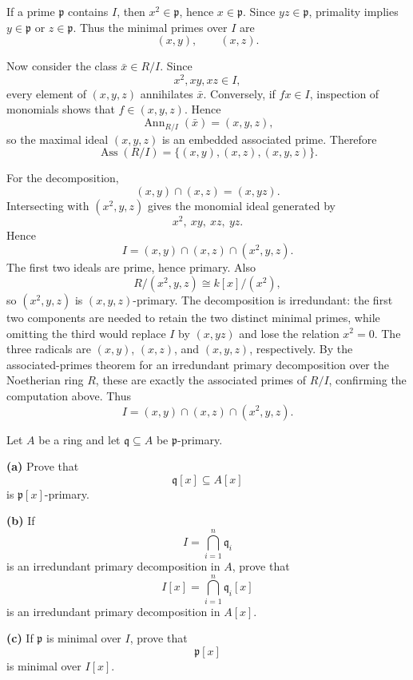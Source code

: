\begin{solution}
If a prime \(\mathfrak p\) contains \(I\), then \(x^2\in\mathfrak p\), hence
\(x\in\mathfrak p\). Since \(yz\in\mathfrak p\), primality implies
\(y\in\mathfrak p\) or \(z\in\mathfrak p\). Thus the minimal primes over
\(I\) are
\[
(x,y),\qquad(x,z).
\]

Now consider the class \(\bar x\in R/I\). Since
\[
x^2,xy,xz\in I,
\]
every element of \((x,y,z)\) annihilates \(\bar x\). Conversely, if
\(fx\in I\), inspection of monomials shows that \(f\in(x,y,z)\). Hence
\[
\operatorname{Ann}_{R/I}(\bar x)=(x,y,z),
\]
so the maximal ideal \((x,y,z)\) is an embedded associated prime. Therefore
\[
\operatorname{Ass}(R/I)
=
\{(x,y),(x,z),(x,y,z)\}.
\]

For the decomposition,
\[
(x,y)\cap(x,z)=(x,yz).
\]
Intersecting with \((x^2,y,z)\) gives the monomial ideal generated by
\[
x^2,\ xy,\ xz,\ yz.
\]
Hence
\[
I=(x,y)\cap(x,z)\cap(x^2,y,z).
\]
The first two ideals are prime, hence primary. Also
\[
R/(x^2,y,z)\cong k[x]/(x^2),
\]
so \((x^2,y,z)\) is \((x,y,z)\)-primary. The decomposition is irredundant: the first two components are
needed to retain the two distinct minimal primes, while omitting the
third would replace $I$ by $(x,yz)$ and lose the relation $x^2=0$.
The three radicals are $(x,y)$, $(x,z)$, and $(x,y,z)$, respectively.
By the associated-primes theorem for an irredundant primary
decomposition over the Noetherian ring $R$, these are exactly the
associated primes of $R/I$, confirming the computation above.
Thus
\[
\boxed{
I=(x,y)\cap(x,z)\cap(x^2,y,z)
}.
\]
\end{solution}


\begin{problem}[CP-V-0029]
\label{prob:cp-v-0029}
Let \(A\) be a ring and let \(\mathfrak q\subseteq A\) be
\(\mathfrak p\)-primary.

\textbf{(a)} Prove that
\[
\mathfrak q[x]\subseteq A[x]
\]
is \(\mathfrak p[x]\)-primary.

\textbf{(b)} If
\[
I=\bigcap_{i=1}^n\mathfrak q_i
\]
is an irredundant primary decomposition in \(A\), prove that
\[
I[x]
=
\bigcap_{i=1}^n\mathfrak q_i[x]
\]
is an irredundant primary decomposition in \(A[x]\).

\textbf{(c)} If \(\mathfrak p\) is minimal over \(I\), prove that
\[
\mathfrak p[x]
\]
is minimal over \(I[x]\).
\end{problem}


